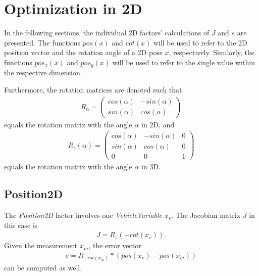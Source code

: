 \section{Optimization in 2D}
In the following sections, the individual 2D factors' calculations of $J$ and $e$ are presented. The functions $pos(x)$ and $rot(x)$ will be used to refer to the 2D position vector and the rotation angle of a 2D pose $x$, respectively. Similarly, the functions $pos_x(x)$ and $pos_y(x)$ will be used to refer to the single value within the respective dimension.

Furthermore, the rotation matrices are denoted such that
\begin{align}
	R_\alpha =
	\begin{pmatrix}
		cos(\alpha) & -sin(\alpha)\\
		sin(\alpha) &  cos(\alpha)
	\end{pmatrix}
\end{align}
equals the rotation matrix with the angle $\alpha$ in 2D, and
\begin{align}
	R_z(\alpha) =
	\begin{pmatrix}
		cos(\alpha) & -sin(\alpha) & 0\\
		sin(\alpha) &  cos(\alpha) & 0\\
		          0 &            0 & 1
	\end{pmatrix}
\end{align}
equals the rotation matrix with the angle $\alpha$ in 3D.



\subsection{Position2D}
The \textit{Position2D} factor involves one \textit{VehicleVariable} $x_v$. The Jacobian matrix $J$ in this case is
\begin{align}
	J = R_z(-rot(x_v)).
\end{align}
Given the measurement $x_m$, the error vector
\begin{align}
	e = R_{-rot(x_m)} * (pos(x_v) - pos(x_m))
\end{align}
can be computed as well.



